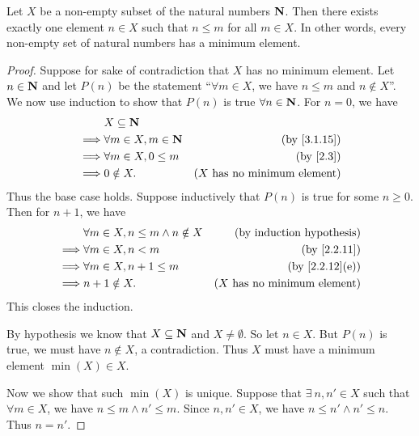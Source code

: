 \begin{proposition}\label{8.1.4}
  Let \(X\) be a non-empty subset of the natural numbers \(\mathbf{N}\).
  Then there exists exactly one element \(n \in X\) such that \(n \leq m\) for all \(m \in X\).
  In other words, every non-empty set of natural numbers has a minimum element.
\end{proposition}

\begin{proof}
  Suppose for sake of contradiction that \(X\) has no minimum element.
  Let \(n \in \mathbf{N}\) and let \(P(n)\) be the statement ``\(\forall m \in X\), we have \(n \leq m\) and \(n \notin X\)''.
  We now use induction to show that \(P(n)\) is true \(\forall n \in \mathbf{N}\).
  For \(n = 0\), we have
  \begin{align*}
             & X \subseteq \N                                                    \\
    \implies & \forall m \in X, m \in \N & \text{(by \cref{3.1.15})}             \\
    \implies & \forall m \in X, 0 \leq m & \text{(by \cref{2.3})}                \\
    \implies & 0 \notin X.               & \text{(\(X\) has no minimum element)}
  \end{align*}
  Thus the base case holds.
  Suppose inductively that \(P(n)\) is true for some \(n \geq 0\).
  Then for \(n + 1\), we have
  \begin{align*}
             & \forall m \in X, n \leq m \land n \notin X & \text{(by induction hypothesis)}      \\
    \implies & \forall m \in X, n < m                     & \text{(by \cref{2.2.11})}             \\
    \implies & \forall m \in X, n + 1 \leq m              & \text{(by \cref{2.2.12}(e))}          \\
    \implies & n + 1 \notin X.                            & \text{(\(X\) has no minimum element)}
  \end{align*}
  This closes the induction.

  By hypothesis we know that \(X \subseteq \mathbf{N}\) and \(X \neq \emptyset\).
  So let \(n \in X\).
  But \(P(n)\) is true, we must have \(n \notin X\), a contradiction.
  Thus \(X\) must have a minimum element \(\min(X) \in X\).

  Now we show that such \(\min(X)\) is unique.
  Suppose that \(\exists\ n, n' \in X\) such that \(\forall m \in X\), we have \(n \leq m \land n' \leq m\).
  Since \(n, n' \in X\), we have \(n \leq n' \land n' \leq n\).
  Thus \(n = n'\).
\end{proof}

